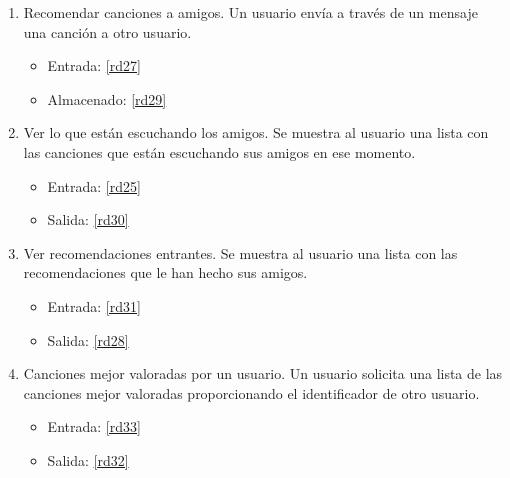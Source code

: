 \documentclass[12pt,a4paper]{article}
\begin{document}
\begin{enumerate}[label=\textnormal{RF\arabic*.}]
	 \item Recomendar canciones a amigos. Un usuario envía a través de un mensaje una canción a otro usuario. \label{rf17}
	 	\begin{itemize}
			\item Entrada: \ref{rd27}
			\item Almacenado: \ref{rd29}
		\end{itemize}
	
	 \item Ver lo que están escuchando los amigos. Se muestra al usuario una lista con las canciones que están escuchando sus amigos en ese momento. \label{rf18}
	 	\begin{itemize}
			\item Entrada: \ref{rd25}
			\item Salida: \ref{rd30}
		\end{itemize}

	 \item Ver recomendaciones entrantes. Se muestra al usuario una lista con las recomendaciones que le han hecho sus amigos. \label{rf19}
	 	\begin{itemize}
			\item Entrada: \ref{rd31}
			\item Salida: \ref{rd28}
		\end{itemize}

	 \item Canciones mejor valoradas por un usuario. Un usuario solicita una lista de las canciones mejor valoradas proporcionando el identificador de otro usuario. \label{rf20}
	 	\begin{itemize}
			\item Entrada:  \ref{rd33}
			\item Salida: \ref{rd32}
		\end{itemize}	
   
\end{enumerate}
\end{document}

